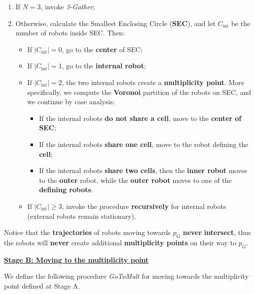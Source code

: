 \begin{enumerate}
    \item If $N = 3$, invoke \textit{3-Gather};
    \item Otherwise, calculate the Smallest Enclosing Circle (\textbf{SEC}), and let $C_{\text{int}}$ be the number of robots inside SEC. Then:
    \begin{itemize}
        \item If $|C_{\text{int}}| = 0$, go to the \textbf{center} of SEC;
        \item If $|C_{\text{int}}| = 1$, go to the \textbf{internal robot};
        \item If $|C_{\text{int}}| = 2$, the two internal robots create a \textbf{multiplicity point}. 
        More specifically, we compute the \textbf{Voronoi} partition of the robots on SEC, and we continue by case analysis:
        \begin{itemize}
            \item If the internal robots \textbf{do not share a cell}, move to the \textbf{center of SEC};
            \item If the internal robots \textbf{share one cell}, move to the robot defining the \textbf{cell};
            \item If the internal robots \textbf{share two cells}, then the \textbf{inner robot} moves to the \textbf{outer} robot, while the \textbf{outer robot} moves to one of the \textbf{defining robots}.
        \end{itemize}
        \item If $|C_{\text{int}}| \geq 3$, invoke the procedure \textbf{recursively} for internal robots (external robots remain stationary).
    \end{itemize}
\end{enumerate}

Notice that the \textbf{trajectories} of robots moving towards $p_G$ \textbf{never} \textbf{intersect}, thus the robots will \textbf{never} create additional \textbf{multiplicity points} on their way to $p_G$.

\textbf{\underline{Stage B: Moving to the multiplicity point}}

We define the following procedure \textit{GoToMult} for moving towards the multiplicity point defined at Stage A.

